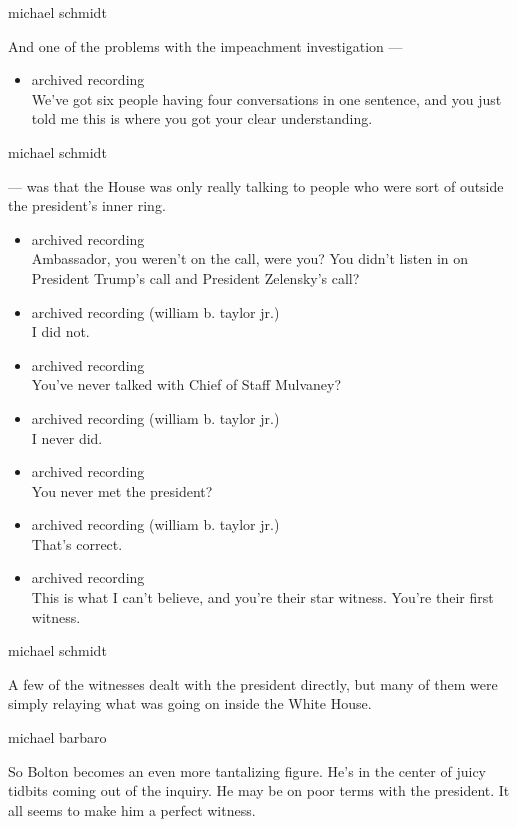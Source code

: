 michael schmidt

And one of the problems with the impeachment investigation ---

\begin{itemize}
\tightlist
\item
  archived recording\\
  We've got six people having four conversations in one sentence, and
  you just told me this is where you got your clear understanding.
\end{itemize}

michael schmidt

--- was that the House was only really talking to people who were sort
of outside the president's inner ring.

\begin{itemize}
\item
  archived recording\\
  Ambassador, you weren't on the call, were you? You didn't listen in on
  President Trump's call and President Zelensky's call?
\item
  archived recording (william b. taylor jr.)\\
  I did not.
\item
  archived recording\\
  You've never talked with Chief of Staff Mulvaney?
\item
  archived recording (william b. taylor jr.)\\
  I never did.
\item
  archived recording\\
  You never met the president?
\item
  archived recording (william b. taylor jr.)\\
  That's correct.
\item
  archived recording\\
  This is what I can't believe, and you're their star witness. You're
  their first witness.
\end{itemize}

michael schmidt

A few of the witnesses dealt with the president directly, but many of
them were simply relaying what was going on inside the White House.

michael barbaro

So Bolton becomes an even more tantalizing figure. He's in the center of
juicy tidbits coming out of the inquiry. He may be on poor terms with
the president. It all seems to make him a perfect witness.

